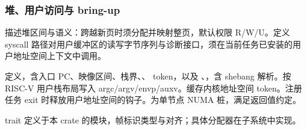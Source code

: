 \subsubsection{堆、用户访问与 bring-up}

描述堆区间与语义：跨越新页时须分配并映射整页，默认权限 R/W/U。定义 syscall 路径对用户缓冲区的读写字节序列与诊断接口，须在当前任务已安装的用户地址空间上下文中调用。

定义，含入口 PC、映像区间、栈界、、 token，以及 、，含 shebang 解析。按 RISC-V 用户栈布局写入 argc/argv/envp/auxv。缓存内核地址空间 token。注册任务 exit 时释放用户地址空间的钩子。为单节点 NUMA 桩，满足返回值约定。

 trait 定义于本 crate 的模块，帧标识类型与对齐；具体分配器在子系统中实现。
